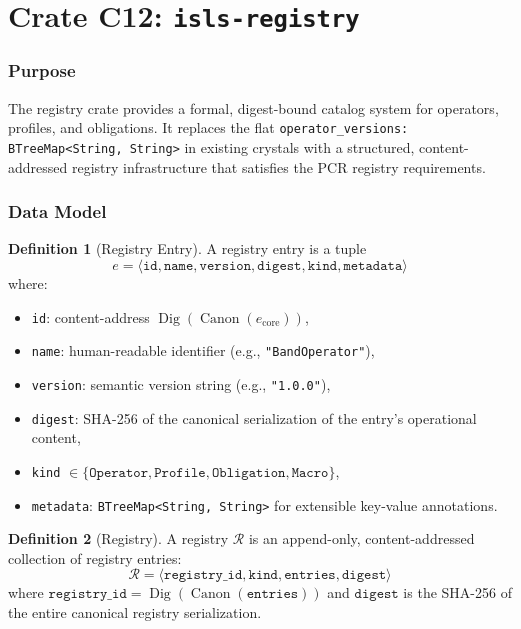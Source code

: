 \documentclass[11pt,a4paper,twoside]{article}
\theoremstyle{definition}
\newtheorem{definition}{Definition}[section]
\theoremstyle{plain}
\theoremstyle{remark}
\newcommand{\calR}{\mathcal{R}}
\DeclareMathOperator{\Canon}{Canon}
\DeclareMathOperator{\Dig}{Dig}
\begin{document}
\part{Crate C12: \texttt{isls-registry}}\label{part:registry}

\section{Purpose}\label{sec:reg:purpose}

The registry crate provides a formal, digest-bound catalog system for
operators, profiles, and obligations. It replaces the flat
\texttt{operator\_versions: BTreeMap<String, String>} in existing
crystals with a structured, content-addressed registry infrastructure
that satisfies the PCR registry requirements.

\section{Data Model}\label{sec:reg:model}

\begin{definition}[Registry Entry]\label{def:regentry}
A registry entry is a tuple
\[
  e = \langle \mathtt{id}, \mathtt{name}, \mathtt{version}, \mathtt{digest},
      \mathtt{kind}, \mathtt{metadata} \rangle
\]
where:
\begin{itemize}[nosep]
  \item \texttt{id}: content-address $\Dig(\Canon(e_{\mathrm{core}}))$,
  \item \texttt{name}: human-readable identifier (e.g., \texttt{"BandOperator"}),
  \item \texttt{version}: semantic version string (e.g., \texttt{"1.0.0"}),
  \item \texttt{digest}: SHA-256 of the canonical serialization of the
        entry's operational content,
  \item \texttt{kind} $\in \{\texttt{Operator}, \texttt{Profile},
        \texttt{Obligation}, \texttt{Macro}\}$,
  \item \texttt{metadata}: \texttt{BTreeMap<String, String>} for
        extensible key-value annotations.
\end{itemize}
\end{definition}

\begin{definition}[Registry]\label{def:registry}
A registry $\calR$ is an append-only, content-addressed collection of
registry entries:
\[
  \calR = \langle \mathtt{registry\_id}, \mathtt{kind}, \mathtt{entries},
           \mathtt{digest} \rangle
\]
where $\mathtt{registry\_id} = \Dig(\Canon(\mathtt{entries}))$ and
$\mathtt{digest}$ is the SHA-256 of the entire canonical registry
serialization.
\end{definition}
\end{document}
